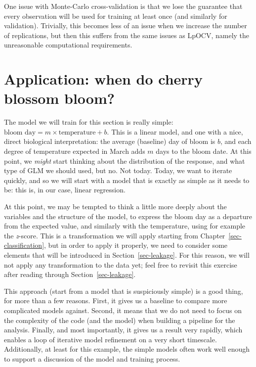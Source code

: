 \documentclass[
  letterpaper,
]{scrbook}
\begin{document}
One issue with Monte-Carlo cross-validation is that we lose the
guarantee that every observation will be used for training at least once
(and similarly for validation). Trivially, this becomes less of an issue
when we increase the number of replications, but then this suffers from
the same issues as LpOCV, namely the unreasonable computational
requirements.

\section{Application: when do cherry blossom
bloom?}\label{application-when-do-cherry-blossom-bloom}

The model we will train for this section is really simple:
\(\text{bloom day} = m \times \text{temperature} + b\). This is a linear
model, and one with a nice, direct biological interpretation: the
average (baseline) day of bloom is \(b\), and each degree of temperature
expected in March adds \(m\) days to the bloom date. At this point, we
\emph{might} start thinking about the distribution of the response, and
what type of GLM we should used, but no. Not today. Today, we want to
iterate quickly, and so we will start with a model that is exactly as
simple as it needs to be: this is, in our case, linear regression.

At this point, we may be tempted to think a little more deeply about the
variables and the structure of the model, to express the bloom day as a
departure from the expected value, and similarly with the temperature,
using for example the \emph{z}-score. This is a transformation we will
apply starting from Chapter~\ref{sec-classification}, but in order to
apply it properly, we need to consider some elements that will be
introduced in Section~\ref{sec-leakage}. For this reason, we will not
apply any transformation to the data yet; feel free to revisit this
exercise after reading through Section~\ref{sec-leakage}.

This approach (start from a model that is suspiciously simple) is a good
thing, for more than a few reasons. First, it gives us a baseline to
compare more complicated models against. Second, it means that we do not
need to focus on the complexity of the code (and the model) when
building a pipeline for the analysis. Finally, and most importantly, it
gives us a result very rapidly, which enables a loop of iterative model
refinement on a very short timescale. Additionally, at least for this
example, the simple models often work well enough to support a
discussion of the model and training process.
\end{document}
